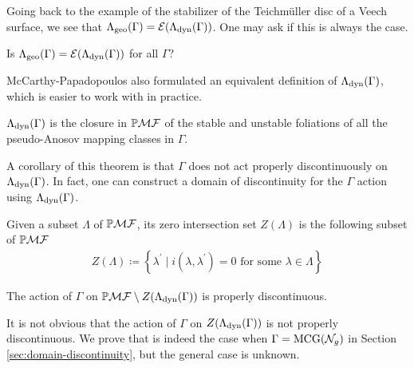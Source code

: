 \documentclass[12pt, reqno]{amsart}
\begin{document}
Going back to the example of the stabilizer of the Teichmüller disc of a Veech surface, we see that $\Lambda_{\mathrm{geo}}(\Gamma) = \mathcal{E}(\Lambda_{\mathrm{dyn}}(\Gamma))$.
One may ask if this is always the case.
\begin{question}
  Is $\Lambda_{\mathrm{geo}}(\Gamma) = \mathcal{E}(\Lambda_{\mathrm{dyn}}(\Gamma))$ for all $\Gamma$?
\end{question}

McCarthy-Papadopoulos also formulated an equivalent definition of $\Lambda_{\mathrm{dyn}}(\Gamma)$, which is easier to work with in practice.

\begin{theorem}
  \label{thm:equivalence-of-limit-sets}
  $\Lambda_{\mathrm{dyn}}(\Gamma)$ is the closure in $\mathbb{P}\mathcal{MF}$ of the stable and unstable foliations of all the pseudo-Anosov mapping classes in $\Gamma$.
\end{theorem}
A corollary of this theorem is that $\Gamma$ does not act properly discontinuously on $\Lambda_{\mathrm{dyn}}(\Gamma)$.
In fact, one can construct a domain of discontinuity for the $\Gamma$ action using $\Lambda_{\mathrm{dyn}}(\Gamma)$.
\begin{definition}
  Given a subset $\Lambda$ of $\mathbb{P}\mathcal{MF}$, its zero intersection set $Z(\Lambda)$ is the following subset of $\mathbb{P}\mathcal{MF}$
  \begin{align*}
    Z(\Lambda) \coloneqq \left\{ \lambda^{\prime} \mid i(\lambda, \lambda^{\prime}) = 0 \text{ for some $\lambda \in \Lambda$} \right\}
  \end{align*}
\end{definition}

\begin{theorem}
  The action of $\Gamma$ on $\mathbb{P}\mathcal{MF} \setminus Z(\Lambda_{\mathrm{dyn}}(\Gamma))$ is properly discontinuous.
\end{theorem}

It is not obvious that the action of $\Gamma$ on $Z(\Lambda_{\mathrm{dyn}}(\Gamma))$ is not properly discontinuous.
We prove that is indeed the case when $\Gamma = \mathrm{MCG}(\mathcal{N}_g)$ in Section \ref{sec:domain-discontinuity}, but the general case is unknown.
\end{document}
